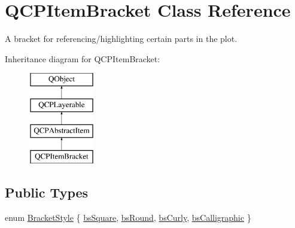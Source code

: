 \hypertarget{classQCPItemBracket}{\section{Q\-C\-P\-Item\-Bracket Class Reference}
\label{classQCPItemBracket}
}


A bracket for referencing/highlighting certain parts in the plot.  


Inheritance diagram for Q\-C\-P\-Item\-Bracket\-:\begin{figure}[H]
\begin{center}
\leavevmode
\includegraphics[height=4.000000cm]{classQCPItemBracket}
\end{center}
\end{figure}
\subsection*{Public Types}
\begin{DoxyCompactItemize}
\item 
enum \hyperlink{classQCPItemBracket_a7ac3afd0b24a607054e7212047d59dbd}{Bracket\-Style} \{ \hyperlink{classQCPItemBracket_a7ac3afd0b24a607054e7212047d59dbda7f9df4a7359bfe3dac1dbe4ccf5d220c}{bs\-Square}, 
\hyperlink{classQCPItemBracket_a7ac3afd0b24a607054e7212047d59dbda394627b0830a26ee3e0a02ca67a9f918}{bs\-Round}, 
\hyperlink{classQCPItemBracket_a7ac3afd0b24a607054e7212047d59dbda5024ce4023c2d8de4221f1cd4816acd8}{bs\-Curly}, 
\hyperlink{classQCPItemBracket_a7ac3afd0b24a607054e7212047d59dbda8f29f5ef754e2dc9a9efdedb2face0f3}{bs\-Calligraphic}
 \}
\end{DoxyCompactItemize}
